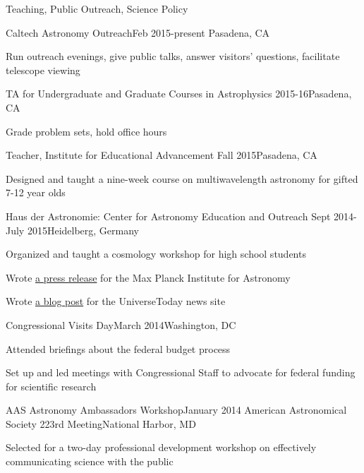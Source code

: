 \documentclass{resume} %
\begin{document}
\begin{rSection}{Teaching, Public Outreach, Science Policy}

  \begin{rSubsection}{Caltech Astronomy Outreach}{Feb 2015-present}
    {}{Pasadena, CA}
  \item Run outreach evenings, give public talks, answer visitors' questions,
    facilitate telescope viewing
  \end{rSubsection}

  \begin{rSubsection}{TA for Undergraduate and Graduate Courses in Astrophysics}
    {2015-16}{}{Pasadena, CA}
  \item Grade problem sets, hold office hours
  \end{rSubsection}

  \begin{rSubsection}{Teacher, Institute for Educational Advancement}
    {Fall 2015}{}{Pasadena, CA}
  \item Designed and taught a nine-week course on multiwavelength astronomy
    for gifted 7-12 year olds
  \end{rSubsection}

  \begin{rSubsection}
    {Haus der Astronomie: Center for Astronomy Education and Outreach}
    {Sept 2014-July 2015}{}{Heidelberg, Germany}
  \item Organized and taught a cosmology workshop for high school students
  \item Wrote \href{http://www.mpia.de/news/science/2015-03-biosignatures}
    {a press release} for the Max Planck Institute for Astronomy
  \item Wrote \href{http://www.universetoday.com/120820/distant-stellar-nurseries-this-time-in-high-definition/}
    {a blog post} for the UniverseToday news site
  \end{rSubsection}

  \begin{rSubsection}{Congressional Visits Day}{March 2014}{}{Washington, DC}
  \item Attended briefings about the federal budget process
  \item Set up and led meetings with Congressional Staff to advocate
    for federal funding for scientific research
  \end{rSubsection}

  \begin{rSubsection}{AAS Astronomy Ambassadors Workshop}{January 2014}
  {American Astronomical Society 223rd Meeting}{National Harbor, MD}
  \item Selected for a two-day professional development workshop on
    effectively communicating science with the public
  \end{rSubsection}


\end{rSection}
\end{document}
